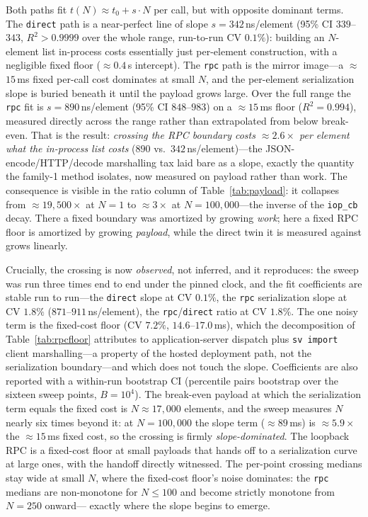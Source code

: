 \documentclass[conference]{IEEEtran}
\newcommand{\code}[1]{\texttt{#1}}
\begin{document}
Both paths fit $t(N)\approx t_0 + s\cdot N$ per call, but with opposite dominant
terms. The \code{direct} path is a near-perfect line of slope $s=342$\,ns/element
(95\% CI $339$--$343$, $R^2>0.9999$ over the whole range, run-to-run CV $0.1\%$):
building an $N$-element list in-process costs essentially just per-element
construction, with a negligible fixed floor ($\approx$$0.4$\,\textmu s intercept).
The \code{rpc} path is the mirror
image---a $\approx$$15$\,ms fixed per-call cost dominates at small $N$, and the
per-element serialization slope is buried beneath it until the payload grows
large. Over the full range the \code{rpc} fit is $s=890$\,ns/element (95\% CI
$848$--$983$) on a $\approx$$15$\,ms floor ($R^2=0.994$), measured directly
across the range rather than extrapolated from below break-even. That is
the result: \emph{crossing the RPC boundary costs $\approx$$2.6\times$ per element
what the in-process list costs} ($890$ vs.\ $342$\,ns/element)---the
JSON-encode/HTTP/decode marshalling tax laid bare as a slope, exactly the quantity
the family-1 method isolates, now measured on payload rather than work. The
consequence is visible in the ratio column of Table~\ref{tab:payload}: it
collapses from $\approx$$19{,}500\times$ at $N{=}1$ to $\approx$$3\times$ at
$N{=}100{,}000$---the inverse of the \code{iop\_cb} decay. There a fixed boundary was amortized by
growing \emph{work}; here a fixed RPC floor is amortized by growing \emph{payload},
while the direct twin it is measured against grows linearly.

Crucially, the crossing is now \emph{observed}, not inferred, and it reproduces:
the sweep was run three times end to end under the pinned clock, and the fit
coefficients are stable run to run---the \code{direct} slope at CV $0.1\%$, the
\code{rpc} serialization slope at CV $1.8\%$ ($871$--$911$\,ns/element), the
\code{rpc}/\code{direct} ratio at CV $1.8\%$. The one noisy term is the fixed-cost
floor (CV $7.2\%$, $14.6$--$17.0$\,ms), which the decomposition of
Table~\ref{tab:rpcfloor} attributes to application-server dispatch plus
\code{sv~import} client marshalling---a property of the hosted deployment path,
not the serialization boundary---and which does not touch the slope. Coefficients are also reported with a within-run
bootstrap CI (percentile pairs bootstrap over the sixteen sweep points, $B{=}10^4$).
The break-even payload at which the serialization term equals the fixed cost is
$N\approx17{,}000$ elements, and the sweep measures $N$ nearly six times beyond
it: at $N{=}100{,}000$ the slope term ($\approx$$89$\,ms) is $\approx$$5.9\times$
the $\approx$$15$\,ms fixed cost, so the crossing is firmly
\emph{slope-dominated}. The loopback RPC is a fixed-cost floor at small payloads
that hands off to a serialization curve at large ones, with the handoff directly
witnessed. The per-point crossing medians stay wide at
small $N$, where the fixed-cost floor's noise dominates: the \code{rpc} medians are
non-monotone for $N\le100$ and become strictly monotone from $N{=}250$ onward---%
exactly where the slope begins to emerge.
\end{document}
